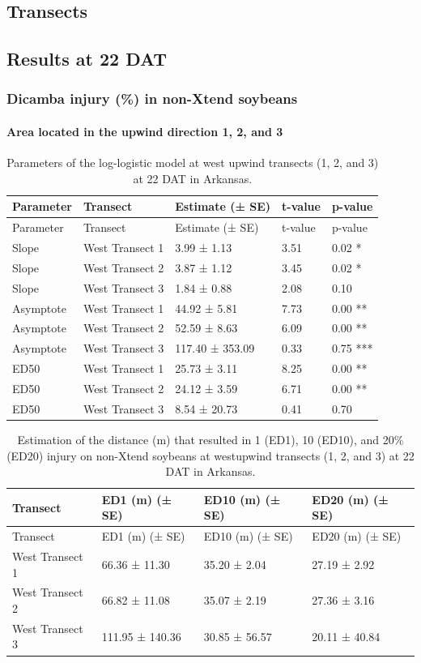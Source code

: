 \documentclass[]{article}
\let\oldparagraph\paragraph
\renewcommand{\paragraph}[1]{\oldparagraph{#1}\mbox{}}
\begin{document}
\pagebreak
\newpage

\subsection{Transects}\label{transects}

\pagebreak
\newpage

\subsection{Results at 22 DAT}\label{results-at-22-dat}

\subsubsection{Dicamba injury (\%) in non-Xtend
soybeans}\label{dicamba-injury-in-non-xtend-soybeans}

\paragraph{\texorpdfstring{Area located in the \textbf{upwind} direction
1, 2, and
3}{Area located in the upwind direction 1, 2, and 3}}\label{area-located-in-the-upwind-direction-1-2-and-3}

\begin{longtable}[]{@{}lllll@{}}
\caption{Parameters of the log-logistic model at west upwind transects
(1, 2, and 3) at 22 DAT in Arkansas.}\tabularnewline
\toprule
Parameter & Transect & Estimate (± SE) & t-value &
p-value\tabularnewline
\midrule
\endfirsthead
\toprule
Parameter & Transect & Estimate (± SE) & t-value &
p-value\tabularnewline
\midrule
\endhead
Slope & West Transect 1 & 3.99 ± 1.13 & 3.51 & 0.02 *\tabularnewline
Slope & West Transect 2 & 3.87 ± 1.12 & 3.45 & 0.02 *\tabularnewline
Slope & West Transect 3 & 1.84 ± 0.88 & 2.08 & 0.10\tabularnewline
Asymptote & West Transect 1 & 44.92 ± 5.81 & 7.73 & 0.00
**\tabularnewline
Asymptote & West Transect 2 & 52.59 ± 8.63 & 6.09 & 0.00
**\tabularnewline
Asymptote & West Transect 3 & 117.40 ± 353.09 & 0.33 & 0.75
***\tabularnewline
ED50 & West Transect 1 & 25.73 ± 3.11 & 8.25 & 0.00 **\tabularnewline
ED50 & West Transect 2 & 24.12 ± 3.59 & 6.71 & 0.00 **\tabularnewline
ED50 & West Transect 3 & 8.54 ± 20.73 & 0.41 & 0.70\tabularnewline
\bottomrule
\end{longtable}

\begin{longtable}[]{@{}llll@{}}
\caption{Estimation of the distance (m) that resulted in 1 (ED1), 10
(ED10), and 20\% (ED20) injury on non-Xtend soybeans at westupwind
transects (1, 2, and 3) at 22 DAT in Arkansas.}\tabularnewline
\toprule
Transect & ED1 (m) (± SE) & ED10 (m) (± SE) & ED20 (m) (±
SE)\tabularnewline
\midrule
\endfirsthead
\toprule
Transect & ED1 (m) (± SE) & ED10 (m) (± SE) & ED20 (m) (±
SE)\tabularnewline
\midrule
\endhead
West Transect 1 & 66.36 ± 11.30 & 35.20 ± 2.04 & 27.19 ±
2.92\tabularnewline
West Transect 2 & 66.82 ± 11.08 & 35.07 ± 2.19 & 27.36 ±
3.16\tabularnewline
West Transect 3 & 111.95 ± 140.36 & 30.85 ± 56.57 & 20.11 ±
40.84\tabularnewline
\bottomrule
\end{longtable}
\end{document}
